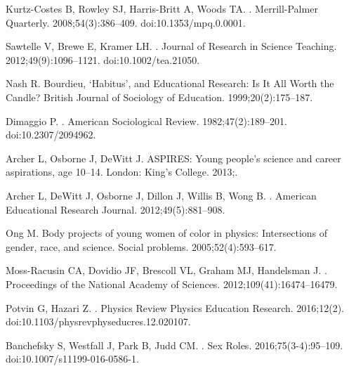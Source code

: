 \begin{thebibliography}{10}
Kurtz-Costes B, Rowley SJ, Harris-Britt A, Woods TA.
.
\newblock Merrill-Palmer Quarterly. 2008;54(3):386--409.
\newblock doi:{10.1353/mpq.0.0001}.

Sawtelle V, Brewe E, Kramer LH.
.
\newblock Journal of Research in Science Teaching. 2012;49(9):1096--1121.
\newblock doi:{10.1002/tea.21050}.

Nash R.
\newblock Bourdieu, `Habitus', and Educational Research: Is It All Worth the Candle?
\newblock British Journal of Sociology of Education. 1999;20(2):175--187.

Dimaggio P.
.
\newblock American Sociological Review. 1982;47(2):189--201.
\newblock doi:{10.2307/2094962}.

Archer L, Osborne J, DeWitt J.
\newblock ASPIRES: Young people's science and career aspirations, age 10--14.
\newblock London: King's College. 2013;.

Archer L, DeWitt J, Osborne J, Dillon J, Willis B, Wong B.
.
\newblock American Educational Research Journal. 2012;49(5):881--908.

Ong M.
\newblock Body projects of young women of color in physics: Intersections of
  gender, race, and science.
\newblock Social problems. 2005;52(4):593--617.

Moss-Racusin CA, Dovidio JF, Brescoll VL, Graham MJ, Handelsman J.
.
\newblock Proceedings of the National Academy of Sciences.
  2012;109(41):16474--16479.

Potvin G, Hazari Z.
.
\newblock Physics Review Physics Education Research. 2016;12(2).
\newblock doi:{10.1103/physrevphyseducres.12.020107}.

Banchefsky S, Westfall J, Park B, Judd CM.
.
\newblock Sex Roles. 2016;75(3-4):95--109.
\newblock doi:{10.1007/s11199-016-0586-1}.


\end{thebibliography}
